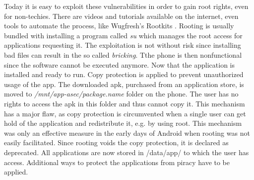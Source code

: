Today it is easy to exploit these vulnerabilities in order to gain root rights, even for non-techies.
There are videos and tutorials available on the internet, even tools to automate the process, like Wugfresh's Rootkits \cite{wugfresh}.
Rooting is usually bundled with installing a program called \textit{su} which manages the root access for applications requesting it.
The exploitation is not without risk since installing bad files can result in the so called \textit{bricking}.
Tthe phone is then nonfunctional since the software cannot be executed anymore.
 \cite{androidpoliceRoot}
\newline
Now that the application is installed and ready to run.
Copy protection is applied to prevent unauthorized usage of the app.
The downloaded \gls{apk}, purchased from an application store, is moved to \textit{/mnt/app-asec/package.name} folder on the phone.
The user has no rights to access the \gls{apk} in this folder and thus cannot copy it.
This mechanism has a major flaw, as copy protection is circumvented when a single user can get hold of the application and redistribute it, e.g. by using root.
This mechanism was only an effective measure in the early days of Android when rooting was not easily facilitated.
\newline
Since rooting voids the copy protection, it is declared as deprecated.
All applications are now stored in \gls{/data/app/} to which the user has access.
Additional ways to protect the applications from piracy have to be applied.
